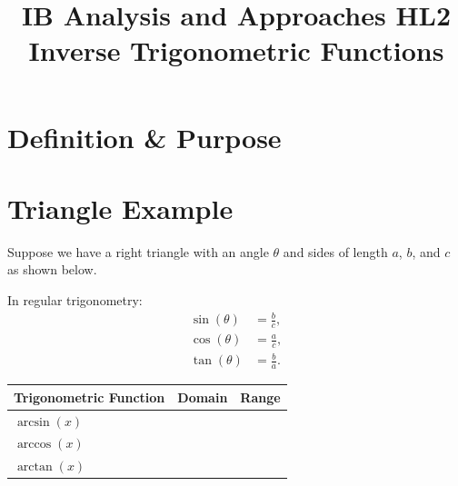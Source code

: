 \documentclass{article}
\title{\textbf{IB Analysis and Approaches HL2 \\ Inverse Trigonometric Functions}}
\author{}
\date{}
\begin{document}
\maketitle

\section*{Definition \& Purpose}

\begin{tcolorbox}[colback=white, colframe=sectioncolor!50, width=\textwidth, height=2in, valign=center, halign=left]
\end{tcolorbox}

\section*{Triangle Example}
Suppose we have a right triangle with an angle $\theta$ and sides of length $a$, $b$, and $c$ as shown below.

\begin{center}
\end{center}

In regular trigonometry:
\begin{align*}
\sin(\theta) &= \frac{b}{c}, \\
\cos(\theta) &= \frac{a}{c}, \\
\tan(\theta) &= \frac{b}{a}.
\end{align*}

\begin{center}
\begin{tabular}{|p{}|p{}|p{}|}
\hline
\rowcolor{tableheadercolor}
\textbf{Trigonometric Function} & \textbf{Domain} & \textbf{Range} \\
\hline
$\arcsin(x)$ & & \\
\hline
$\arccos(x)$ & & \\
\hline
$\arctan(x)$ & & \\
\hline
\end{tabular}
\end{center}
\end{document}
